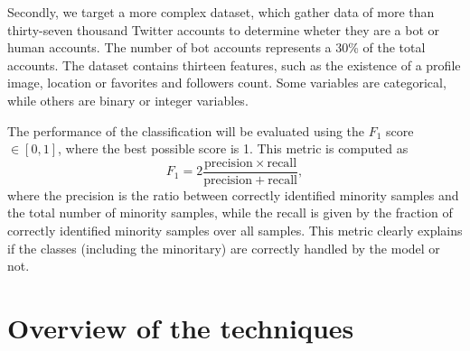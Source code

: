 \documentclass[conference]{IEEEtran}
\begin{document}
		Secondly, we target a more complex dataset, which gather data of more than thirty-seven thousand Twitter accounts to determine wheter they are a bot or human accounts. The number of bot accounts represents a 30\% of the total accounts. The dataset contains thirteen features, such as the existence of a profile image, location or favorites and followers count. Some variables are categorical, while others are binary or integer variables. 

		The performance of the classification will be evaluated using the $F_1$ score $\in [0, 1]$, where the best possible score is 1. This metric is computed as
			\begin{equation*}
				F_1 = 2\frac{\mathrm{precision}\times\mathrm{recall}}{\mathrm{precision}+\mathrm{recall}},
			\end{equation*}
where the precision is the ratio between correctly identified minority samples and the total number of minority samples, while the recall is given by the fraction of correctly identified minority samples over all samples. This metric clearly explains if the classes (including the minoritary) are correctly handled by the model or not. 


\section{Overview of the techniques}
\end{document}
